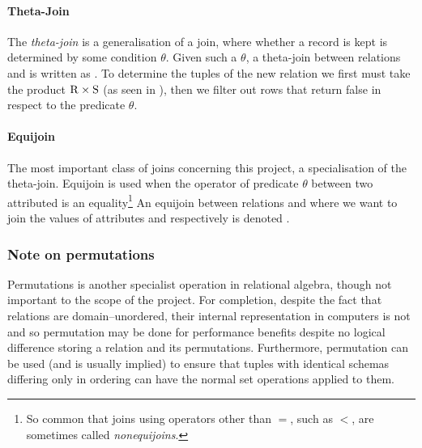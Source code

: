 \paragraph{Theta-Join} The \emph{theta-join} is a generalisation of a join, where whether a record is kept is determined by some condition $\theta$. Given such a $\theta$, a theta-join between relations  and  is written as . To determine the tuples of the new relation  we first must take the product $\mathrm{R} \times \mathrm{S}$ (as seen in ), then we filter out rows that return false in respect to the predicate $\theta$.\cite{DatabaseSystems}

\paragraph{Equijoin} The most important class of joins concerning this project, a specialisation of the theta-join. Equijoin is used when the operator of predicate $\theta$ between two attributed is an equality\footnote{So common that joins using operators other than $=$, such as $<$, are sometimes called \emph{nonequijoins}.\cite{JoinProcessing}} An equijoin between relations  and  where we want to join the values of attributes  and  respectively is denoted .
\subsubsection{Note on permutations}
Permutations is another specialist operation in relational algebra, though not important to the scope of the project. For completion, despite the fact that relations are domain--unordered, their internal representation in computers is not and so permutation may be done for performance benefits despite no logical difference storing a relation and its permutations.\cite{RelationalModel} Furthermore, permutation can be used (and is usually implied) to ensure that tuples with identical schemas differing only in ordering can have the normal set operations applied to them. \cite{DatabaseSystems}
